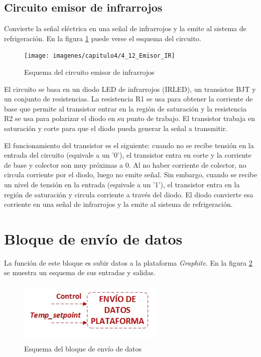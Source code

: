 {\subsection{Circuito emisor de infrarrojos}\label{subsec:infrarrojos}

	Convierte la señal eléctrica en una señal de infrarrojos y la emite al sistema de refrigeración. En la figura \ref{4_12:emisor_IR} puede verse el esquema del circuito.

\begin{figure}[htbp]
  \centering
  \texttt{[image: imagenes/capitulo4/4\_12\_Emisor\_IR]}
   \caption{Esquema del circuito emisor de infrarrojos}
   \label{4_12:emisor_IR}
\end{figure}

	El circuito se basa en un diodo LED de infrarrojos (IRLED), un transistor BJT y un conjunto de resistencias. La resistencia R1 se usa para obtener la corriente de base que permite al transistor entrar en la región de saturación y la resistencia R2 se usa para polarizar el diodo en su punto de trabajo. El transistor trabaja en saturación y corte para que el diodo pueda generar la señal a transmitir. 

	El funcionamiento del transistor es el siguiente: cuando no se recibe tensión en la entrada del circuito (equivale a un '0'), el transistor entra en corte y la corriente de base y colector son muy próximas a 0. Al no haber corriente de colector, no circula corriente por el diodo, luego no emite señal. Sin embargo, cuando se recibe un nivel de tensión en la entrada (equivale a un '1'), el transistor entra en la región de saturación y circula corriente a través del diodo. El diodo convierte esa corriente en una señal de infrarrojos y la emite al sistema de refrigeración.

\section{Bloque de envío de datos}\label{sec:envioDatos}

	La función de este bloque es subir datos a la plataforma \textit{Graphite}. En la figura \ref{4_13:envio_datos} se muestra un esquema de sus entradas y salidas.

\begin{figure}[htbp]
  \centering
  \includegraphics[width=70mm, height=30mm]{imagenes/capitulo4/4_13_Envio_Datos}
   \caption{Esquema del bloque de envío de datos}
   \label{4_13:envio_datos}
\end{figure}

}
